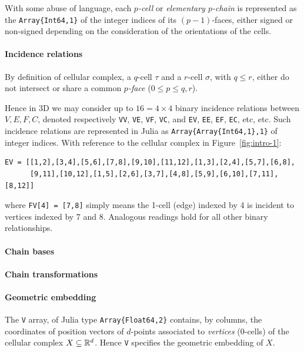 With some abuse of language, each \emph{$p$-cell} or \emph{elementary $p$-chain} is represented as the \texttt{Array\{Int64,1\}} of the integer indices of its $(p-1)$-faces, either signed or non-signed depending on the consideration of the orientations of the cells.


\paragraph{Incidence relations}

By definition of cellular complex, a $q$-cell $\tau$ and a $r$-cell $\sigma$, with $q\leq r$, either do not intersect or share a common \emph{$p$-face} ($0\leq p\leq q,r$).

Hence in 3D we may consider up to $16=4\times 4$ binary incidence relations between $V,E,F,C$, denoted respectively \texttt{VV}, \texttt{VE}, \texttt{VF}, \texttt{VC}, and
\texttt{EV}, \texttt{EE}, \texttt{EF}, \texttt{EC}, etc, etc.  Such incidence relations are represented in Julia as \texttt{Array\{Array\{Int64,1\},1\}} of integer indices. With reference to the cellular complex in Figure~\ref{fig:intro-1}:

{\small\begin{verbatim}
EV = [[1,2],[3,4],[5,6],[7,8],[9,10],[11,12],[1,3],[2,4],[5,7],[6,8],
      [9,11],[10,12],[1,5],[2,6],[3,7],[4,8],[5,9],[6,10],[7,11],[8,12]]
\end{verbatim}
}
where \texttt{FV[4] = [7,8]} simply means the 1-cell (edge) indexed by 4 is incident to vertices indexed by 7 and 8. Analogous readings hold for all other binary relationships.


\paragraph{Chain bases}

\paragraph{Chain transformations}

\paragraph{Geometric embedding}

The \texttt{V} array, of Julia type \texttt{Array\{Float64,2\}} contains, by columns, the coordinates of position vectors of $d$-points associated to \emph{vertices} (0-cells) of the cellular complex $X \subseteq \mathbb{R}^d$. Hence \texttt{V} specifies the geometric embedding of $X$.


